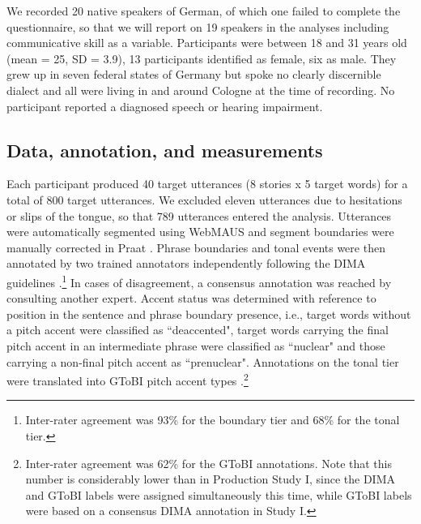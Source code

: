 We recorded 20 native speakers of German, of which one failed to complete the questionnaire, so that we will report on 19 speakers in the analyses including communicative skill as a variable. Participants were between 18 and 31 years old (mean = 25, SD = 3.9), 13 participants identified as female, six as male. They grew up in seven federal states of Germany but spoke no clearly discernible dialect and all were living in and around Cologne at the time of recording. No participant reported a diagnosed speech or hearing impairment. 

\subsection{Data, annotation, and measurements} \label{section: measurements study2}

Each participant produced 40 target utterances (8 stories x 5 target words) for a total of 800 target utterances. We excluded eleven utterances due to hesitations or slips of the tongue, so that 789 utterances entered the analysis. Utterances were automatically segmented using WebMAUS \citep{schielAutomaticPhoneticTranscription1999, kislerMultilingualProcessingSpeech2017} and segment boundaries were manually corrected in Praat \citep{boersmaPraatDoingPhonetics2023}. Phrase boundaries and tonal events were then annotated by two trained annotators independently following the DIMA guidelines \citep{kuglerDeutscheIntonationModellierung2022}.\footnote{Inter-rater agreement was 93\% for the boundary tier and 68\% for the tonal tier.} In cases of disagreement, a consensus annotation was reached by consulting another expert. Accent status was determined with reference to position in the sentence and phrase boundary presence, i.e., target words without a pitch accent were classified as ``deaccented", target words carrying the final pitch accent in an intermediate phrase were classified as ``nuclear" and those carrying a non-final pitch accent as ``prenuclear". Annotations on the tonal tier were translated into GToBI pitch accent types \citep{griceGermanIntonationAutosegmentalMetrical2005}.\footnote{Inter-rater agreement was 62\% for the GToBI annotations. Note that this number is considerably lower than in Production Study I, since the DIMA and GToBI labels were assigned simultaneously this time, while GToBI labels were based on a consensus DIMA annotation in Study I.}

